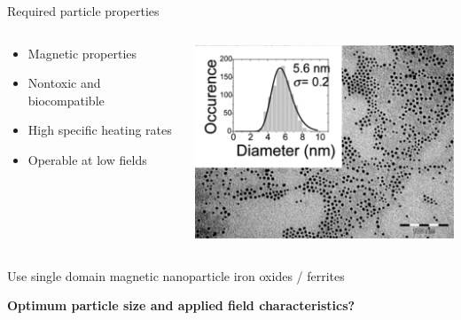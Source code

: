 \documentclass{sotonbeamer}
\begin{document}
\begin{frame}{Required particle properties}
  \begin{columns}
    \begin{column}{0.49\linewidth}
      \begin{itemize}
      \item Magnetic properties
      \item Nontoxic and biocompatible
      \item High specific heating rates
      \item Operable at low fields
      \end{itemize}
    \end{column}
    \begin{column}{0.49\linewidth}
      \includegraphics[width=\linewidth]{figures/particles.png}
    \end{column}
  \end{columns}
  \begin{center}
     \vspace{4mm}
     Use single domain magnetic nanoparticle iron oxides / ferrites
     \vspace{4mm}

     \textbf{Optimum particle size and applied field characteristics?}
  \end{center}
\end{frame}
\end{document}
